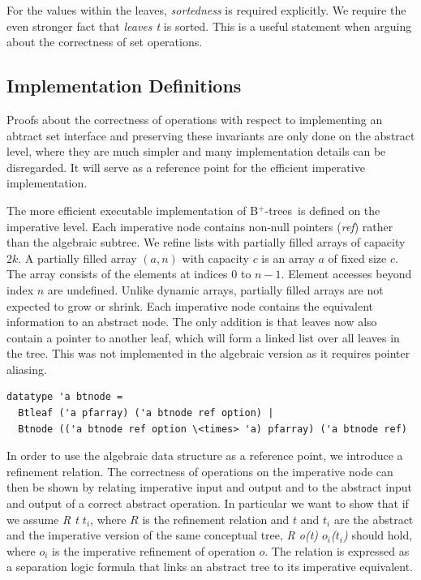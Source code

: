 \documentclass[runningheads]{llncs}
\newcommand{\btrees}{B$^+$-trees}
\begin{document}
For the values within the leaves, \textit{sortedness} is required explicitly.
We require the even stronger fact that \emph{leaves t} is sorted.
This is a useful statement when arguing about the correctness of set operations.

\subsection{Implementation Definitions}
\label{sec:data_structure_imps}

Proofs about the correctness of operations
with respect to implementing an abtract set interface and
preserving these invariants
are only done on the abstract level, where they are much simpler
and many implementation details can be disregarded.
It will serve as a reference point for the efficient
imperative implementation.

The more efficient executable implementation of \btrees\ is defined
on the imperative level.
Each imperative node contains non-null pointers (\emph{ref}) rather than the algebraic subtree.
We refine lists with partially filled arrays of capacity $2k$.
A partially filled array $(a,n)$ with capacity $c$ is an array $a$ of fixed size $c$.
The array consists of the elements at indices 0 to $n-1$.
Element accesses beyond index $n$ are undefined.
Unlike dynamic arrays, partially filled arrays are not expected to grow or shrink.
Each imperative node contains the equivalent information to an abstract node.
The only addition is that leaves now also contain a pointer to another leaf,
which will form a linked list over all leaves in the tree.
This was not implemented in the algebraic version as it requires pointer aliasing.

\begin{lstlisting}[mathescape=true, language=Isabelle,label=lst:btree-imp-def]
datatype 'a btnode =
  Btleaf ('a pfarray) ('a btnode ref option) |
  Btnode (('a btnode ref option \<times> 'a) pfarray) ('a btnode ref) 
\end{lstlisting}

In order to use the algebraic data structure as a reference point,
we introduce a refinement relation.
The correctness of operations on the imperative node
can then be shown by relating imperative input and output
and to the abstract input and output of a correct abstract operation.
In particular we want to show that if we assume \emph{R t $t_i$},
where $R$ is the refinement relation and $t$ and $t_i$ are the abstract
and the imperative version of the same conceptual tree,
\emph{R o(t) $o_i$($t_i$)} should hold, where $o_i$ is the imperative refinement
of operation $o$.
The relation is expressed as a separation logic formula that links an abstract tree to its
imperative equivalent.
\end{document}
